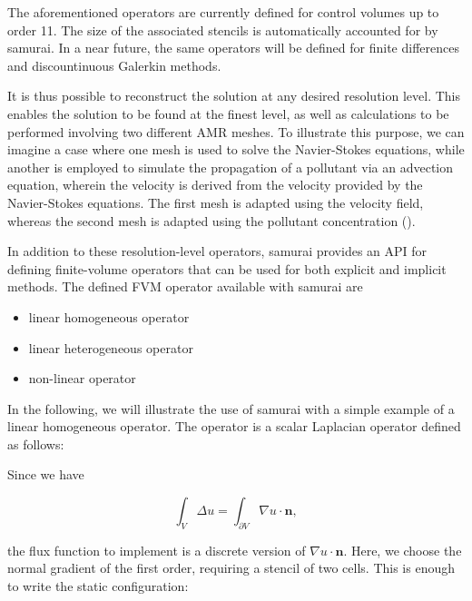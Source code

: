 The aforementioned operators are currently defined for control volumes up to order 11. The size of the associated stencils is automatically accounted for by samurai. In a near future, the same operators will be defined for finite differences and discountinuous Galerkin methods.

It is thus possible to reconstruct the solution at any desired resolution level. This enables the solution to be found at the finest level, as well as calculations to be performed involving two different AMR meshes. To illustrate this purpose, we can imagine a case where one mesh is used to solve the Navier-Stokes equations, while another is employed to simulate the propagation of a pollutant via an advection equation, wherein the velocity is derived from the velocity provided by the Navier-Stokes equations. The first mesh is adapted using the velocity field, whereas the second mesh is adapted using the pollutant concentration (\cite{nguessan_high_2021}).

In addition to these resolution-level operators, samurai provides an API for defining finite-volume operators that can be used for both explicit and implicit methods. The defined FVM operator available with samurai are

\begin{itemize}
    \item linear homogeneous operator
    \item linear heterogeneous operator
    \item non-linear operator
\end{itemize}

In the following, we will illustrate the use of samurai with a simple example of a linear homogeneous operator. The operator is a scalar Laplacian operator defined as follows:

Since we have

\begin{equation*}
\int_V \Delta u = \int_{\partial V} \nabla u\cdot \mathbf{n},
\end{equation*}

the flux function to implement is a discrete version of $\nabla u\cdot \mathbf{n}$.
Here, we choose the normal gradient of the first order, requiring a stencil of two cells.
This is enough to write the static configuration:

